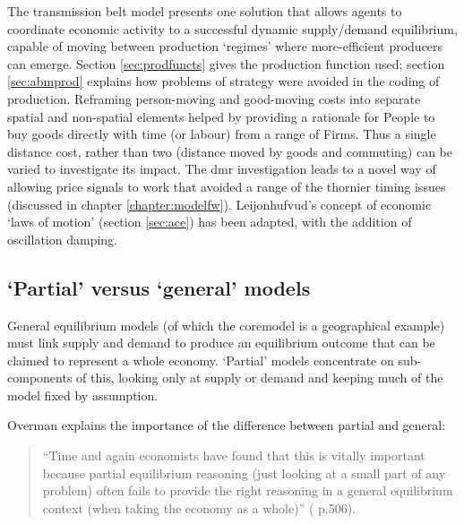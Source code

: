 The transmission belt model presents one solution that allows agents to coordinate economic activity to a successful dynamic supply/demand equilibrium, capable of moving between production `regimes' where more-efficient producers can emerge. Section \ref{sec:prodfuncts} gives the production function used; section \ref{sec:abmprod} explains how problems of strategy were avoided in the coding of production. Reframing person-moving and good-moving costs into separate spatial and non-spatial elements helped by providing a rationale for People to buy goods directly with time (or labour) from a range of Firms. Thus a single distance cost, rather than two (distance moved by goods and commuting) can be varied to investigate its impact. The \gls{dmr} investigation leads to a novel way of allowing price signals to work that avoided a range of the thornier timing issues (discussed in chapter \ref{chapter:modelfw}). Leijonhufvud's concept of economic `laws of motion' (section \ref{sec:ace}) has been adapted, with the addition of oscillation damping.

\subsection{`Partial' versus `general' models}

General equilibrium models (of which the \gls{coremodel} is a geographical example) must link supply and demand to produce an equilibrium outcome that can be claimed to represent a whole economy. `Partial' models concentrate on sub-components of this, looking only at supply or demand and keeping much of the model fixed by assumption. 

Overman explains the importance of the difference between partial and general:

\begin{quote}
``Time and again economists have found that this is vitally important because partial equilibrium reasoning (just looking at a small part of any problem) often fails to provide the right reasoning in a general equilibrium context (when taking the economy as a whole)'' (\citealt{overman_can_2004} p.506).
\end{quote}

